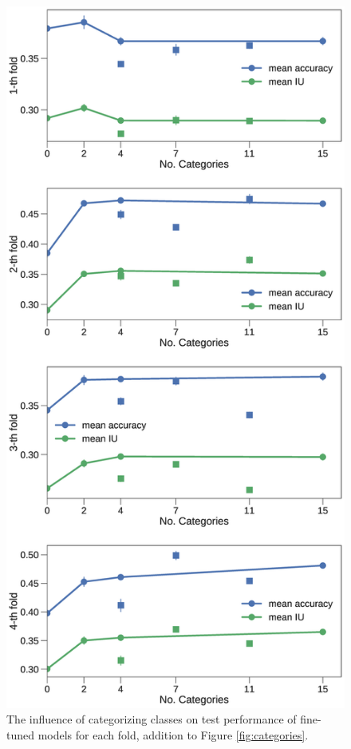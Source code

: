 \begin{figure}[t]
\centering
   \includegraphics[width=\linewidth]{img/num_classes_folds.eps}
\caption{The influence of categorizing classes on test performance of fine-tuned models for each fold, addition to Figure \ref{fig:categories}.}
\label{fig:classesfold}
\end{figure}
